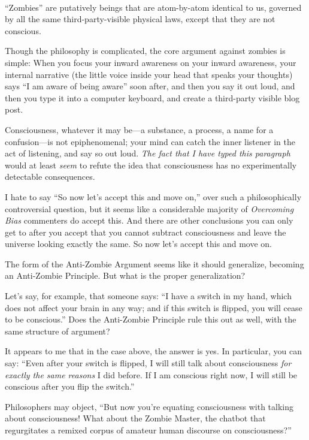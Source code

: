 \bigskip

{
 ~}

{
 ``Zombies'' are putatively
beings that are atom-by-atom identical to us, governed by all the same
third-party-visible physical laws, except that they are not conscious.}

{
 Though the philosophy is complicated, the core argument against
zombies is simple: When you focus your inward awareness on your inward
awareness, your internal narrative (the little voice inside your head
that speaks your thoughts) says ``I am aware of being
aware'' soon after, and then you say it out loud, and
then you type it into a computer keyboard, and create a third-party
visible blog post.}

{
 Consciousness, whatever it may be---a substance, a process, a name
for a confusion---is not epiphenomenal; your mind can catch the inner
listener in the act of listening, and say so out loud. \textit{The fact
that I have typed this paragraph} would at least \textit{seem} to
refute the idea that consciousness has no experimentally detectable
consequences.}

{
 I hate to say ``So now let's
accept this and move on,'' over such a
philosophically controversial question, but it seems like a
considerable majority of \textit{Overcoming Bias} commenters do accept
this. And there are other conclusions you can only get to after you
accept that you cannot subtract consciousness and leave the universe
looking exactly the same. So now let's accept this and
move on.}

{
 The form of the Anti-Zombie Argument seems like it should
generalize, becoming an Anti-Zombie Principle. But what is the proper
generalization?}

{
 Let's say, for example, that someone says:
``I have a switch in my hand, which does not affect
your brain in any way; and if this switch is flipped, you will cease to
be conscious.'' Does the Anti-Zombie Principle rule
this out as well, with the same structure of argument?}

{
 It appears to me that in the case above, the answer is yes. In
particular, you can say: ``Even after your switch is
flipped, I will still talk about consciousness \textit{for exactly the
same reasons} I did before. If I am conscious right now, I will still
be conscious after you flip the switch.''}

{
 Philosophers may object, ``But now
you're equating consciousness with talking about
consciousness! What about the Zombie Master, the chatbot that
regurgitates a remixed corpus of amateur human discourse on
consciousness?''}

